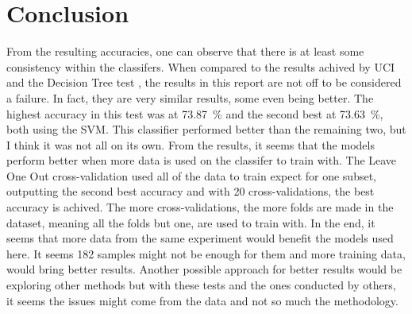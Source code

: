 \documentclass[conference,compsoc]{IEEEtran}
\begin{document}
\section{Conclusion}
From the resulting accuracies, one can observe that there is at least some consistency within the classifers. When compared to the results 
achived by UCI and the Decision Tree test \cite{fuzzy}, the results in this report are not off to be considered a failure. In fact, they are very similar results,
some even being better. The highest accuracy in this test was at \SI{73.87}{\percent} and the second best at \SI{73.63}{\percent}, both using the SVM. 
This classifier performed better than the remaining two, but I think it was not all on its own. From the results, it seems that the models perform better when 
more data is used on the classifer to train with. The Leave One Out cross-validation used all of the data to train expect for one subset, outputting the second 
best accuracy and with 20 cross-validations, the best accuracy is achived. The more cross-validations, the more folds are made in the dataset, meaning all the folds but one, are 
used to train with. In the end, it seems that more data from the same experiment would benefit the models used here. It seems 182 samples might not be enough for them and more training data, would bring better results. 
Another possible approach for better results would be exploring other methods but with these tests and the ones conducted by others, it seems the issues might come from the data and not so much the methodology.




\end{document}

